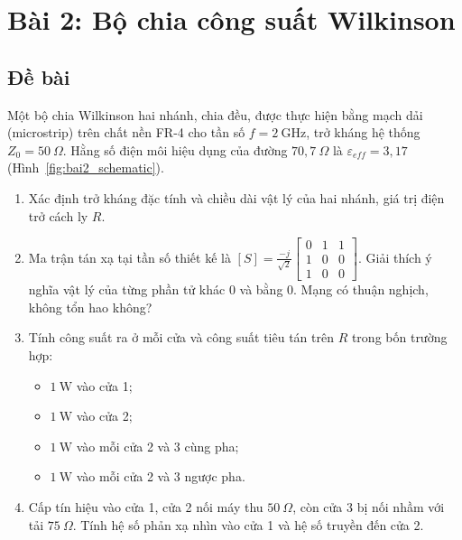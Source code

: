 \documentclass[12pt,a4paper]{article}
\begin{document}
\section{Bài 2: Bộ chia công suất Wilkinson}

\subsection{Đề bài}
Một bộ chia Wilkinson hai nhánh, chia đều, được thực hiện bằng mạch dải (microstrip) trên chất nền FR-4 cho tần số $f = 2~\text{GHz}$, trở kháng hệ thống $Z_0 = 50~\Omega$. Hằng số điện môi hiệu dụng của đường $70{,}7~\Omega$ là $\varepsilon_{eff} = 3{,}17$ (Hình~\ref{fig:bai2_schematic}).
\begin{enumerate}
    \item[(a)] Xác định trở kháng đặc tính và chiều dài vật lý của hai nhánh, giá trị điện trở cách ly $R$.
    \item[(b)] Ma trận tán xạ tại tần số thiết kế là $[S] = \frac{-j}{\sqrt{2}} \begin{bmatrix} 0 & 1 & 1 \\ 1 & 0 & 0 \\ 1 & 0 & 0 \end{bmatrix}$. Giải thích ý nghĩa vật lý của từng phần tử khác 0 và bằng 0. Mạng có thuận nghịch, không tổn hao không?
    \item[(c)] Tính công suất ra ở mỗi cửa và công suất tiêu tán trên $R$ trong bốn trường hợp: 
    \begin{itemize}
        \item $1~\text{W}$ vào cửa 1;
        \item $1~\text{W}$ vào cửa 2;
        \item $1~\text{W}$ vào mỗi cửa 2 và 3 cùng pha;
        \item $1~\text{W}$ vào mỗi cửa 2 và 3 ngược pha.
    \end{itemize}
    \item[(d)] Cấp tín hiệu vào cửa 1, cửa 2 nối máy thu $50~\Omega$, còn cửa 3 bị nối nhầm với tải $75~\Omega$. Tính hệ số phản xạ nhìn vào cửa 1 và hệ số truyền đến cửa 2.
\end{enumerate}
\end{document}
